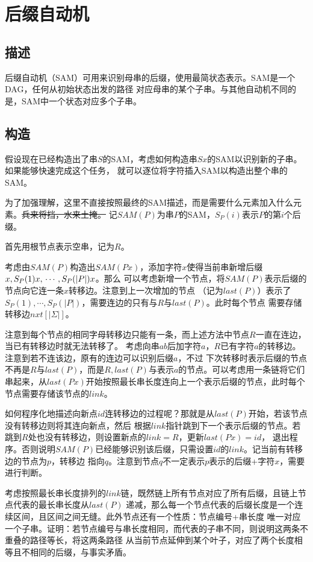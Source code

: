 \section{后缀自动机}
\subsection{描述}
后缀自动机（SAM）可用来识别母串的后缀，使用最简状态表示。SAM是一个DAG，任何从初始状态出发的路径
对应母串的某个子串。与其他自动机不同的是，SAM中一个状态对应多个子串。

\subsection{构造}
假设现在已经构造出了串$S$的SAM，考虑如何构造串$Sx$的SAM以识别新的子串。如果能够快速完成这个任务，
就可以逐位将字符插入SAM以构造出整个串的SAM。

为了加强理解，这里不直接按照最终的SAM描述，而是需要什么元素加入什么元素。\sout{兵来将挡，水来土掩。}
记$SAM(P)$为串$P$的SAM，$S_P(i)$表示$P$的第$i$个后缀。

首先用根节点表示空串，记为$R$。

考虑由$SAM(P)$构造出$SAM(Px)$，添加字符$x$使得当前串新增后缀$x,S_P(1)x,\\\cdots,S_P(|P|)x$。那么
可以考虑新增一个节点，将$SAM(P)$表示后缀的节点向它连一条$x$转移边。注意到上一次增加的节点
（记为$last(P)$）表示了$S_P(1),\cdots,S_P(|P|)$，需要连边的只有与$R$与$last(P)$。此时每个节点
需要存储转移边$nxt[|\Sigma|]$。

注意到每个节点的相同字母转移边只能有一条，而上述方法中节点$R$一直在连边，当已有转移边时就无法转移了。
考虑向串$ab$后加字符$a$，$R$已有字符$a$的转移边。注意到若不连该边，原有的连边可以识别后缀$a$，不过
下次转移时表示后缀的节点不再是$R$与$last(P)$，而是$R,last(P)$与表示$a$的节点。可以考虑用一条链将它们
串起来，从$last(Px)$开始按照最长串长度连向上一个表示后缀的节点，此时每个节点需要存储该节点的$link$。

如何程序化地描述向新点$id$连转移边的过程呢？那就是从$last(P)$开始，若该节点没有转移边则将其连向新点，然后
根据$link$指针跳到下一个表示后缀的节点。若跳到$R$处也没有转移边，则设置新点的$link=R$，更新$last(Px)=id$，
退出程序。否则说明$SAM(P)$已经能够识别该后缀，只需设置$id$的$link$。记当前有转移边的节点为$p$，转移边
指向$q$。注意到节点$q$不一定表示$p$表示的后缀+字符$x$，需要进行判断。

考虑按照最长串长度排列的$link$链，既然链上所有节点对应了所有后缀，且链上节点代表的最长串长度从$last(P)$
递减，那么每一个节点代表的后缀长度是一个连续区间，且区间之间无缝。此外节点还有一个性质：节点编号+串长度
唯一对应一个子串。证明：若节点编号与串长度相同，而代表的子串不同，则说明这两条不重叠的路径等长，将这两条路径
从当前节点延伸到某个叶子，对应了两个长度相等且不相同的后缀，与事实矛盾。

